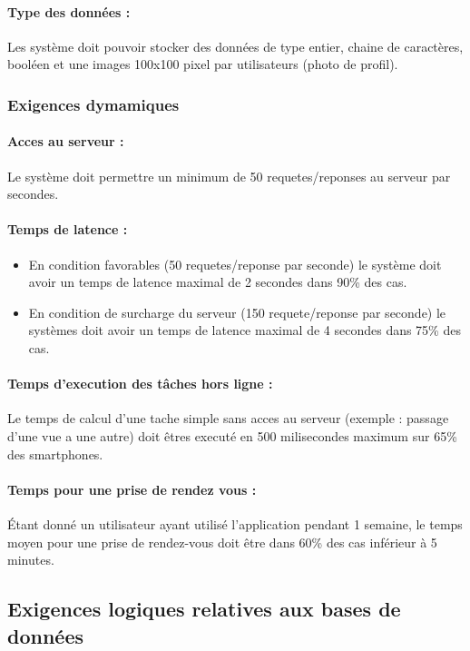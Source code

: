 \documentclass{article}
\begin{document}
\paragraph{Type des données :}
Les système doit pouvoir stocker des données de type entier, chaine de
caractères, booléen et une images 100x100 pixel par utilisateurs
(photo de profil).


\subsubsection{Exigences dymamiques}
\paragraph{Acces au serveur :}
Le système doit permettre un minimum de 50 requetes/reponses au serveur
par secondes.
\paragraph{Temps de latence :}
\begin{itemize}
\item En condition favorables (50 requetes/reponse par seconde) le
  système doit avoir un temps de latence maximal de 2 secondes dans
  90\% des cas.
\item En condition de surcharge du serveur (150 requete/reponse par
  seconde) le systèmes doit avoir un temps de latence maximal de 4
  secondes dans 75\% des cas.
\end{itemize}

\paragraph{Temps d'execution des tâches hors ligne :}
Le temps de calcul d'une tache simple sans acces au serveur (exemple : passage d'une vue a
une autre) doit êtres executé en 500 milisecondes maximum sur 65\% des
smartphones.

\paragraph{Temps pour une prise de rendez vous :}
Étant donné un utilisateur ayant utilisé l'application pendant 1
semaine, le temps moyen pour une prise de rendez-vous doit être dans
60\% des cas inférieur à 5 minutes.

\subsection{Exigences logiques relatives aux bases de données}
\end{document}
